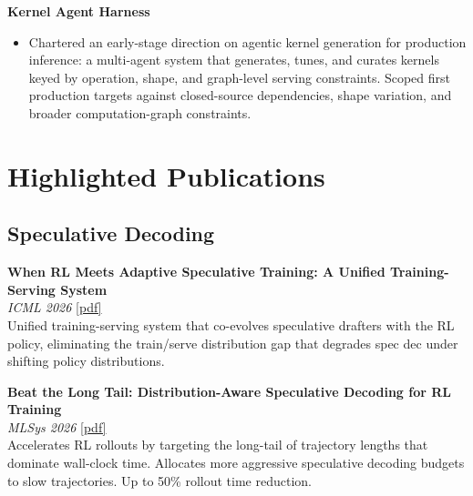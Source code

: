 \documentclass[11pt,letterpaper]{article}
\begin{document}
\vspace{6pt}
\noindent\textbf{Kernel Agent Harness}
\begin{itemize}
\item Chartered an early-stage direction on agentic kernel generation for production inference: a multi-agent system that generates, tunes, and curates kernels keyed by operation, shape, and graph-level serving constraints. Scoped first production targets against closed-source dependencies, shape variation, and broader computation-graph constraints.
\end{itemize}




\section{Highlighted Publications}

\subsection*{Speculative Decoding}
\noindent\textbf{When RL Meets Adaptive Speculative Training: A Unified Training-Serving System}\\
\textit{ICML 2026} \href{https://arxiv.org/abs/2602.06932}{[pdf]}\\[2pt]
Unified training-serving system that co-evolves speculative drafters with the RL policy, eliminating the train/serve distribution gap that degrades spec dec under shifting policy distributions.

\vspace{6pt}
\noindent\textbf{Beat the Long Tail: Distribution-Aware Speculative Decoding for RL Training}\\
\textit{MLSys 2026} \href{https://arxiv.org/abs/2511.13841}{[pdf]}\\[2pt]
Accelerates RL rollouts by targeting the long-tail of trajectory lengths that dominate wall-clock time. Allocates more aggressive speculative decoding budgets to slow trajectories. Up to 50\% rollout time reduction.
\end{document}
